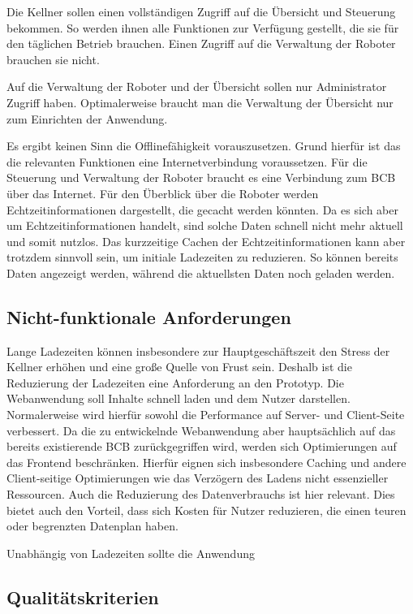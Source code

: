 Die Kellner sollen einen vollständigen Zugriff auf die Übersicht und Steuerung bekommen. So werden ihnen alle Funktionen zur Verfügung gestellt, die sie für den täglichen Betrieb brauchen. Einen Zugriff auf die Verwaltung der Roboter brauchen sie nicht.

Auf die Verwaltung der Roboter und der Übersicht sollen nur Administrator Zugriff haben. Optimalerweise braucht man die Verwaltung der Übersicht nur zum Einrichten der Anwendung.

Es ergibt keinen Sinn die Offlinefähigkeit vorauszusetzen. Grund hierfür ist das die relevanten Funktionen eine Internetverbindung voraussetzen. Für die Steuerung und Verwaltung der Roboter braucht es eine Verbindung zum \ac{BCB} über das Internet. Für den Überblick über die Roboter werden Echtzeitinformationen dargestellt, die gecacht werden könnten. Da es sich aber um Echtzeitinformationen handelt, sind solche Daten schnell nicht mehr aktuell und somit nutzlos. Das kurzzeitige Cachen der Echtzeitinformationen kann aber trotzdem sinnvoll sein, um initiale Ladezeiten zu reduzieren. So können bereits Daten angezeigt werden, während die aktuellsten Daten noch geladen werden.

\subsection{Nicht-funktionale Anforderungen}

Lange Ladezeiten können insbesondere zur Hauptgeschäftszeit den Stress der Kellner erhöhen und eine große Quelle von Frust sein. Deshalb ist die Reduzierung der Ladezeiten eine Anforderung an den Prototyp. Die Webanwendung soll Inhalte schnell laden und dem Nutzer darstellen. Normalerweise wird hierfür sowohl die Performance auf Server- und Client-Seite verbessert. Da die zu entwickelnde Webanwendung aber hauptsächlich auf das bereits existierende \ac{BCB} zurückgegriffen wird, werden sich Optimierungen auf das Frontend beschränken. Hierfür eignen sich insbesondere Caching und andere Client-seitige Optimierungen wie das Verzögern des Ladens nicht essenzieller Ressourcen. Auch die Reduzierung des Datenverbrauchs ist hier relevant. Dies bietet auch den Vorteil, dass sich Kosten für Nutzer reduzieren, die einen teuren oder begrenzten Datenplan haben.

Unabhängig von Ladezeiten sollte die Anwendung 

\subsection{Qualitätskriterien}
